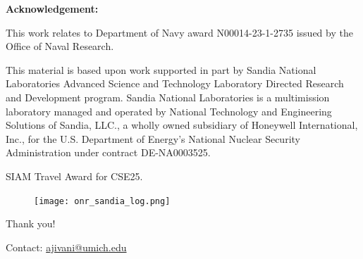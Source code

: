 \documentclass[usenames,dvipsnames,aspectratio=169]{beamer}
\theoremstyle{definition}
\begin{document}
%     

%     


\begin{frame}{}

    \normalsize \textbf{Acknowledgement:}

    This work relates to Department of Navy award 
    N00014-23-1-2735 issued by the Office of Naval Research.


    \normalsize This material is based upon work supported in part by Sandia National Laboratories Advanced Science and Technology Laboratory Directed Research and Development program. Sandia National Laboratories is a multimission laboratory managed and operated by National Technology and Engineering Solutions of Sandia, LLC., a wholly owned subsidiary of Honeywell International, Inc., for the U.S. Department of Energy's National Nuclear Security Administration under contract DE-NA0003525. 

    SIAM Travel Award for CSE25.

    \begin{figure}
        \centering
        \texttt{[image: onr\_sandia\_log.png]}
    \end{figure}

\end{frame}

\begin{frame}{}
\begin{center}
    \Large{Thank you!}

    Contact: \textcolor{blue}{\url{ajivani@umich.edu}}

\end{center}
\end{frame}
\end{document}
